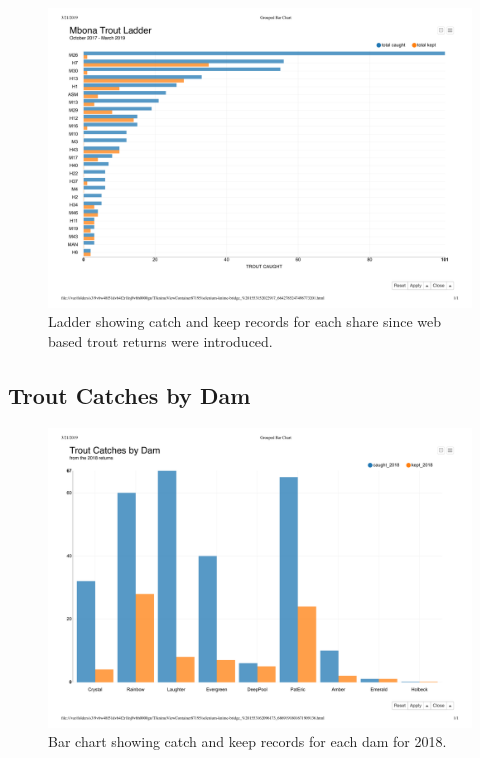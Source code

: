 \begin{appendices}
\begin{figure}[H]
\centering
  \includegraphics[scale=0.5]{tables/MbonaTroutLadder.pdf}
   \caption{Ladder showing catch and keep records for each share since web based trout returns were introduced.}
  \label{fig:MbonaTroutLadder}
\end{figure}


\subsection{Trout Catches by Dam}

\begin{figure}[H]
\centering
  \includegraphics[scale=0.5]{tables/TroutCatchesByDam.pdf}
   \caption{Bar chart showing catch and keep records for each dam for 2018.}
  \label{fig:TroutCatchesByDam}
\end{figure}



\end{appendices}
